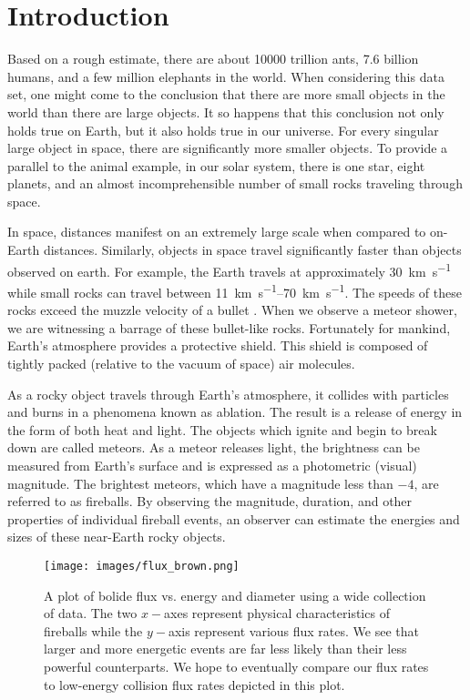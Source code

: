 \chapter{Introduction}

Based on a rough estimate, there are about \num{10000} trillion ants, \num{7.6} billion humans, and a few million elephants in the world.
When considering this data set, one might come to the conclusion that there are more small objects in the world than there are large objects.
It so happens that this conclusion not only holds true on Earth, but it also holds true in our universe.
For every singular large object in space, there are significantly more smaller objects.
To provide a parallel to the animal example, in our solar system, there is one star, eight planets, and an almost incomprehensible number of small rocks traveling through space. 

In space, distances manifest on an extremely large scale when compared to on-Earth distances.  
Similarly, objects in space travel significantly faster than objects observed on earth.
For example, the Earth travels at approximately \SI{30}{\kilo\meter\per\second} while small rocks can travel between \SIrange{11}{70}{\kilo\meter\per\second}.  
The speeds of these rocks exceed the muzzle velocity of a bullet \cite{russell_photometry_2018}.
When we observe a meteor shower, we are witnessing a barrage of these bullet-like rocks.  
Fortunately for mankind, Earth’s atmosphere provides a protective shield.
This shield is composed of tightly packed (relative to the vacuum of space) air molecules.

As a rocky object travels through Earth’s atmosphere, it collides with particles and burns in a phenomena known as ablation.  
The result is a release of energy in the form of both heat and light.  
The objects which ignite and begin to break down are called meteors.
As a meteor releases light, the brightness can be measured from Earth's surface and is expressed as a photometric (visual) magnitude. 
The brightest meteors, which have a magnitude less than $-4$, are referred to as fireballs.
By observing the magnitude, duration, and other properties of individual fireball events, an observer can estimate the energies and sizes of these near-Earth rocky objects.

\begin{figure}[ht!]
  \centering
  \texttt{[image: images/flux\_brown.png]}
  \caption[A plot of bolide flux vs. energy and diameter using a wide collection of data.]{A plot of bolide flux vs. energy and diameter using a wide collection of data.  The two $x-$axes represent physical characteristics of fireballs while the $y-$axis represent various flux rates.  We see that larger and more energetic events are far less likely than their less powerful counterparts.  We hope to eventually compare our flux rates to low-energy collision flux rates depicted in this plot.}
  \label{brown}
\end{figure}


